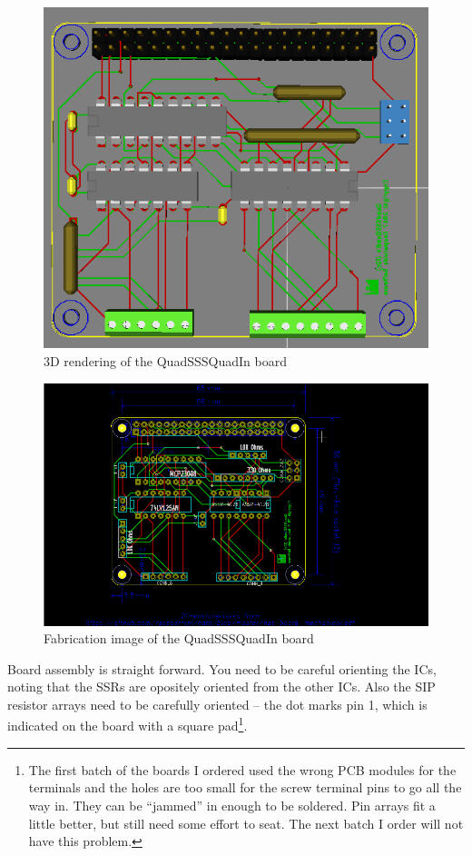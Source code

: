 \begin{figure}[hbpt]\begin{centering}%
\includegraphics[width=5in]{QuadSSSQuadIn3DTop.png}
\caption{3D rendering of the QuadSSSQuadIn board}
\end{centering}\end{figure}
\begin{figure}[hbpt]\begin{centering}%
\includegraphics[width=5in]{QuadSSSQuadIn.png}
\caption{Fabrication image of the QuadSSSQuadIn board}
\end{centering}\end{figure}
Board assembly is straight forward.  You need to be careful orienting the ICs, 
noting that the SSRs are opositely oriented from the other ICs.  Also the 
SIP resistor arrays need to be carefully oriented -- the dot marks pin 1, 
which is indicated on the board with a square pad\footnote{The first batch of 
the boards I ordered used the wrong PCB modules for the terminals and the 
holes are too small for the screw terminal pins to go all the way in.  They 
can be ``jammed'' in enough to be soldered. Pin arrays fit a little better, 
but still need some effort to seat.  The next batch I order will not have this 
problem.}. 

